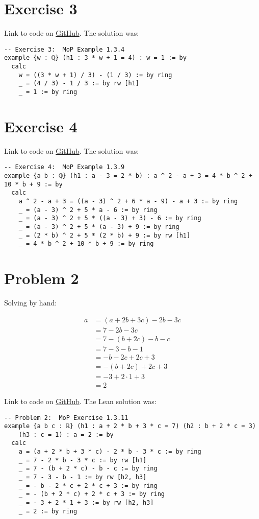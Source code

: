 \documentclass[11pt]{article}
\begin{document}
\section*{Exercise 3}
Link to code on \href{https://github.com/lucastassis/BU-CS511/blob/main/HW01/code/HW01.lean}{GitHub}. The solution was:

\begin{lstlisting}
-- Exercise 3:  MoP Example 1.3.4
example {w : ℚ} (h1 : 3 * w + 1 = 4) : w = 1 := by
  calc
    w = ((3 * w + 1) / 3) - (1 / 3) := by ring
    _ = (4 / 3) - 1 / 3 := by rw [h1]
    _ = 1 := by ring
\end{lstlisting}

\section*{Exercise 4}
Link to code on \href{https://github.com/lucastassis/BU-CS511/blob/main/HW01/code/HW01.lean}{GitHub}. The solution was: 

\begin{lstlisting}
-- Exercise 4:  MoP Example 1.3.9
example {a b : ℚ} (h1 : a - 3 = 2 * b) : a ^ 2 - a + 3 = 4 * b ^ 2 + 10 * b + 9 := by
  calc
    a ^ 2 - a + 3 = ((a - 3) ^ 2 + 6 * a - 9) - a + 3 := by ring
    _ = (a - 3) ^ 2 + 5 * a - 6 := by ring
    _ = (a - 3) ^ 2 + 5 * ((a - 3) + 3) - 6 := by ring
    _ = (a - 3) ^ 2 + 5 * (a - 3) + 9 := by ring
    _ = (2 * b) ^ 2 + 5 * (2 * b) + 9 := by rw [h1]
    _ = 4 * b ^ 2 + 10 * b + 9 := by ring
\end{lstlisting}


\section*{Problem 2}
Solving by hand:

\begin{align*}
    a &= (a + 2b + 3c) -2b -3c \\
      &= 7 - 2b - 3c \\
      &= 7 - (b + 2c) - b - c \\
      &= 7 - 3 - b - 1 \\
      &= -b - 2c + 2c + 3 \\
      &= -(b + 2c) + 2c + 3 \\
      &= -3 + 2 \cdot 1 + 3 \\
      &= 2
\end{align*}

Link to code on \href{https://github.com/lucastassis/BU-CS511/blob/main/HW01/code/HW01.lean}{GitHub}. The Lean solution was: 
\begin{lstlisting}
-- Problem 2:  MoP Exercise 1.3.11
example {a b c : ℝ} (h1 : a + 2 * b + 3 * c = 7) (h2 : b + 2 * c = 3)
    (h3 : c = 1) : a = 2 := by
  calc
    a = (a + 2 * b + 3 * c) - 2 * b - 3 * c := by ring
    _ = 7 - 2 * b - 3 * c := by rw [h1]
    _ = 7 - (b + 2 * c) - b - c := by ring
    _ = 7 - 3 - b - 1 := by rw [h2, h3]
    _ = - b - 2 * c + 2 * c + 3 := by ring
    _ = - (b + 2 * c) + 2 * c + 3 := by ring
    _ = - 3 + 2 * 1 + 3 := by rw [h2, h3]
    _ = 2 := by ring

\end{lstlisting}
\end{document}
